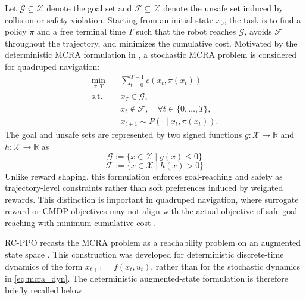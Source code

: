 \documentclass[conference]{IEEEtran}
\begin{document}
Let $\mathcal{G}\subseteq\mathcal{X}$ denote the goal set and $\mathcal{F}\subseteq\mathcal{X}$ denote the unsafe set induced by collision or safety violation. Starting from an initial state $x_0$, the task is to find a policy $\pi$ and a free terminal time $T$ such that the robot reaches $\mathcal{G}$, avoids $\mathcal{F}$ throughout the trajectory, and minimizes the cumulative cost. Motivated by the deterministic MCRA formulation in \cite{DBLP:conf/nips/SoGF24}, a stochastic MCRA problem is considered for quadruped navigation:
\begin{align}
\min_{\pi,T}\quad & \sum_{t=0}^{T-1} c\!\left(x_t,\pi(x_t)\right) \label{eq:mcra_obj}\\
\mathrm{s.t.}\quad & x_T \in \mathcal{G}, \label{eq:mcra_goal}\\
& x_t \notin \mathcal{F},\quad \forall t\in\{0,\dots,T\}, \label{eq:mcra_safe}\\
& x_{t+1}\sim P\!\left(\cdot\mid x_t,\pi(x_t)\right). \label{eq:mcra_dyn}
\end{align}
The goal and unsafe sets are represented by two signed functions
$g:\mathcal{X}\rightarrow\mathbb{R}$ and $h:\mathcal{X}\rightarrow\mathbb{R}$ as
\begin{equation}
\mathcal{G} := \{x\in\mathcal{X}\mid g(x)\le 0\}
\end{equation}
\begin{equation}
\mathcal{F} := \{x\in\mathcal{X}\mid h(x)>0\}
\end{equation}
Unlike reward shaping, this formulation enforces goal-reaching and safety as trajectory-level constraints rather than soft preferences induced by weighted rewards. This distinction is important in quadruped navigation, where surrogate reward or CMDP objectives may not align with the actual objective of safe goal-reaching with minimum cumulative cost \cite{DBLP:conf/nips/SoGF24}.

RC-PPO recasts the MCRA problem as a reachability problem on an augmented state space \cite{DBLP:conf/nips/SoGF24}. This construction was developed for deterministic discrete-time dynamics of the form $x_{t+1}=f(x_t,u_t)$, rather than for the stochastic dynamics in \eqref{eq:mcra_dyn}. The deterministic augmented-state formulation is therefore briefly recalled below. 
\end{document}
